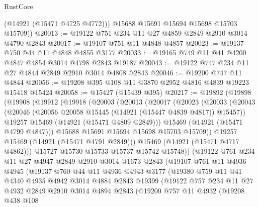\begin{lexlean}{RustCore}
\begin{coremodule}
          (@14921 (@15471 @4725 @4772)))
        @15688
        @15691
        @15694
        @15698
        @15703
        @15709))
@20013 := @19122 @751 @234 @11 @27 @4859 @2849 @2910 @3014 @4790 @2843
@20017 := @19107 @751 @11 @4848 @4857
@20023 := @19137 @750 @44 @11 @4848 @4855 @3177
@20033 := @19165 @749 @11 @41 @4200 @4847 @4854 @3014 @4798 @2843 @19187
@20043 := @19122 @747 @234 @11 @27 @4844 @2849 @2910 @3014 @4808 @2843
@20046 := @19200 @747 @11 @4844
@20056 := @19208 @395 @108 @11 @3870 @2952 @4816 @4839 @19223 @15418 @15424
@20058 := @15427 (@15439 @395)
@20217 := @19892
    (@19898
      (@19908
        (@19912
          (@19918
            (@20003
              (@20013
                (@20017
                  (@20023
                    (@20033
                      (@20043
                        (@20046 (@20056 @20058 @15445 (@14921 (@15447 @4839 @4817)) @15457))
                        @19257
                        @15469
                        (@14921 (@15471 @4809 @2849)))
                      @15469
                      (@14921 (@15471 @4799 @4847)))
                    @15688
                    @15691
                    @15694
                    @15698
                    @15703
                    @15709))
                @19257
                @15469
                (@14921 (@15471 @4791 @2849)))
              @15469
              (@14921 (@15471 @4717 @4862)))
            @15727
            @15730
            @15733
            @15737
            @15742
            @15748))
        (@19122
          @761
          @234
          @11
          @27
          @4947
          @2849
          @2910
          @3014
          @1673
          @2843
          (@19107
            @761
            @11
            @4936
            @4945
            (@19137
              @760
              @44
              @11
              @4936
              @4943
              @3177
              (@19380
                @759
                @11
                @41
                @4340
                @4935
                @4942
                @3014
                @4884
                @2843
                @19399
                (@19122
                  @757
                  @234
                  @11
                  @27
                  @4932
                  @2849
                  @2910
                  @3014
                  @4894
                  @2843
                  (@19200
                    @757
                    @11
                    @4932
                    (@19208
                      @438
                      @108

\end{coremodule}
\end{lexlean}
